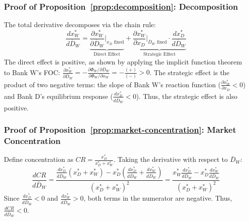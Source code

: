 \documentclass[12pt]{article}
\begin{document}
\subsubsection{Proof of Proposition~\ref{prop:decomposition}: Decomposition}
\label{app:proof-prop7-2}
The total derivative decomposes via the chain rule:
\begin{equation}
\frac{dx_{W}^{*}}{d\overline{D}_{W}} = \underbrace{\frac{\partial x_{W}^{*}}{\partial\overline{D}_{W}}\bigg|_{x_{D} \text{ fixed}}}_{\text{Direct Effect}} + \underbrace{\frac{\partial x_{W}^{*}}{\partial x_{D}}\bigg|_{\overline{D}_{W} \text{ fixed}} \cdot \frac{dx_{D}^{*}}{d\overline{D}_{W}}}_{\text{Strategic Effect}}
\end{equation}
The direct effect is positive, as shown by applying the implicit function theorem to Bank W's FOC: $\frac{\partial x_{W}^{*}}{\partial\overline{D}_{W}} = -\frac{\partial\Phi_{W}/\partial\overline{D}_{W}}{\partial\Phi_{W}/\partial x_{W}} = -\frac{(+)}{(-)} > 0$. The strategic effect is the product of two negative terms: the slope of Bank W's reaction function ($\frac{\partial x_{W}^{*}}{\partial x_{D}} < 0$) and Bank D's equilibrium response ($\frac{dx_{D}^{*}}{d\overline{D}_{W}} < 0$). Thus, the strategic effect is also positive.

\subsubsection{Proof of Proposition~\ref{prop:market-concentration}: Market Concentration}
\label{app:proof-prop7-4}
Define concentration as $CR = \frac{x_{D}^{*}}{x_{D}^{*}+x_{W}^{*}}$. Taking the derivative with respect to $\overline{D}_{W}$:
\begin{equation*}
\frac{dCR}{d\overline{D}_{W}} = \frac{\frac{dx_{D}^{*}}{d\overline{D}_{W}}(x_{D}^{*}+x_{W}^{*}) - x_{D}^{*}(\frac{dx_{D}^{*}}{d\overline{D}_{W}}+\frac{dx_{W}^{*}}{d\overline{D}_{W}})}{(x_{D}^{*}+x_{W}^{*})^2} = \frac{x_{W}^{*}\frac{dx_{D}^{*}}{d\overline{D}_{W}} - x_{D}^{*}\frac{dx_{W}^{*}}{d\overline{D}_{W}}}{(x_{D}^{*}+x_{W}^{*})^2}
\end{equation*}
Since $\frac{dx_{D}^{*}}{d\overline{D}_{W}} < 0$ and $\frac{dx_{W}^{*}}{d\overline{D}_{W}} > 0$, both terms in the numerator are negative. Thus, $\frac{dCR}{d\overline{D}_{W}} < 0$.
\end{document}
